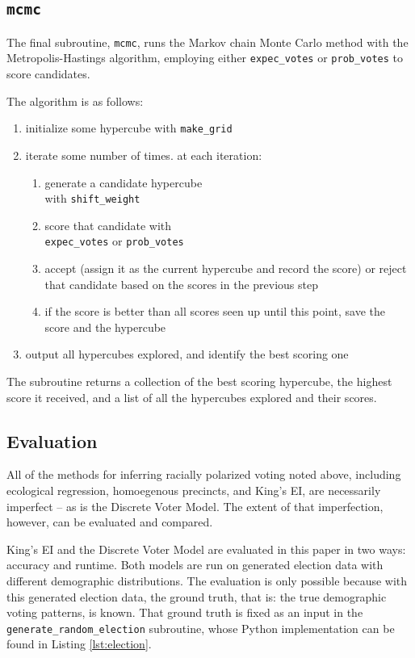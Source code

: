 \documentclass[fleqn,10pt]{style}
\begin{document}
\subsection{\texttt{mcmc}}

The final subroutine, \texttt{mcmc}, runs the Markov chain Monte Carlo method with the Metropolis-Hastings algorithm, employing either \texttt{expec\_votes} or \texttt{prob\_votes} to score candidates.

The algorithm is as follows:

\begin{enumerate}[noitemsep]
  \item initialize some hypercube with \texttt{make\_grid}
  \item iterate some number of times. at each iteration:
  \begin{enumerate}
    \item generate a candidate hypercube \\ with \texttt{shift\_weight}
    \item score that candidate with \\ \texttt{expec\_votes} or \texttt{prob\_votes}
    \item accept (assign it as the current hypercube and record the score) or reject that candidate based on the scores in the previous step
    \item if the score is better than all scores seen up until this point, save the score and the hypercube
  \end{enumerate}
  \item output all hypercubes explored, and identify the best scoring one
\end{enumerate}

The subroutine returns a collection of the best scoring hypercube, the highest score it received, and a list of all the hypercubes explored and their scores.

\subsection{Evaluation}

All of the methods for inferring racially polarized voting noted above, including ecological regression, homoegenous precincts, and King's EI, are necessarily imperfect -- as is the Discrete Voter Model. The extent of that imperfection, however, can be evaluated and compared.

King's EI and the Discrete Voter Model are evaluated in this paper in two ways: accuracy and runtime. Both models are run on generated election data with different demographic distributions. The evaluation is only possible because with this generated election data, the ground truth, that is: the true demographic voting patterns, is known. That ground truth is fixed as an input in the \texttt{generate\_random\_election} subroutine, whose Python implementation can be found in Listing \ref{lst:election}.
\end{document}
